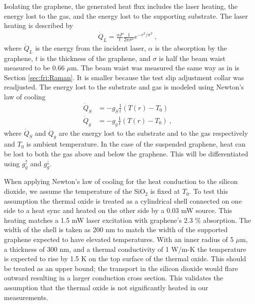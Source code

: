 Isolating the graphene, the generated heat flux includes the laser heating, the energy lost to the gas, and the energy lost to the supporting substrate.
The laser heating is described by
\begin{align}
	\dot{Q}_{L}=\frac{\alpha P}{t} \frac{1}{2 \pi \sigma^2} e^{-r^2/\sigma^2} \ ,
\end{align}
where $\dot{Q}_L$ is the energy from the incident laser, $\alpha$ is the absorption by the graphene, $t$ is the thickness of the graphene, and $\sigma$ is half the beam waist measured to be 0.66 $\mu$m.
The beam waist was measured the same way as in is Section \ref{sec:fri:Raman}.
It is smaller because the test slip adjustment collar was readjusted.
The energy lost to the substrate and gas is modeled using Newton's law of cooling
\begin{align*}
	\dot{Q}_{S}&=-g_S \frac{1}{t} \left(T(r)-T_0 \right) \\
	\dot{Q}_{g}&=-g_g \frac{1}{t} \left(T(r)-T_0 \right) \ ,
\end{align*}
where $\dot{Q}_{S}$ and $\dot{Q}_g$ are the energy lost to the substrate and to the gas respectively and $T_0$ is ambient temperature.
In the case of the suspended graphene, heat can be lost to both the gas above and below the graphene.
This will be differentiated using $g_g^{\uparrow}$ and $g_g^{\downarrow}$.

When applying Newton's law of cooling for the heat conduction to the silicon dioxide, we assume the temperature of the SiO$_2$ is fixed at $T_0$.
To test this assumption the thermal oxide is treated as a cylindrical shell connected on one side to a heat sync and heated on the other side by a 0.03 mW source.
This heating matches a 1.5 mW laser excitation with graphene's 2.3 \% absorption.
The width of the shell is taken as 200 nm to match the width of the supported graphene expected to have elevated temperatures.
With an inner radius of 5 $\mu$m, a thickness of 300 nm, and a thermal conductivity of 1 W/m-K \cite{Resnick2002} the temperature is expected to rise by 1.5 K on the top surface of the thermal oxide.
This should be treated as an upper bound; the transport in the silicon dioxide would flare outward resulting in a larger conduction cross section.
This validates the assumption that the thermal oxide is not significantly heated in our measurements.

